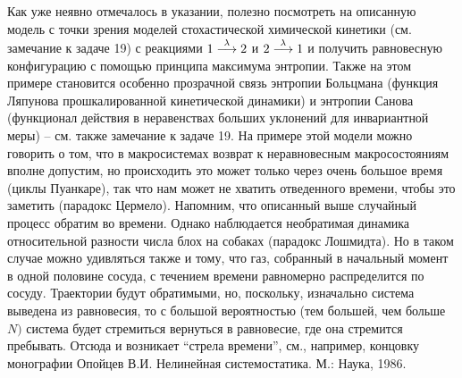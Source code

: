 \begin{remark}
 Как уже неявно отмечалось в указании, полезно посмотреть 
на описанную модель с точки зрения моделей стохастической химической 
кинетики (см. замечание к задаче 19) с реакциями $1\buildrel \lambda \over 
\longrightarrow 2$ и $2\buildrel \lambda \over \longrightarrow 1$ и получить 
равновесную конфигурацию с помощью принципа максимума энтропии. Также на 
этом примере становится особенно прозрачной связь энтропии  Больцмана (функция Ляпунова прошкалированной кинетической динамики) и энтропии Санова (функционал действия в неравенствах больших уклонений для инвариантной меры) -- см. также 
замечание к задаче 19. На примере этой модели можно говорить о том, что в 
макросистемах возврат к неравновесным макросостояниям вполне допустим, но 
происходить это может только через очень большое время (циклы Пуанкаре), так что нам может 
не хватить отведенного времени, чтобы это заметить (парадокс Цермело). Напомним, что 
описанный выше случайный процесс обратим во времени. Однако наблюдается 
необратимая динамика относительной разности числа блох на собаках (парадокс Лошмидта). Но в 
таком случае можно удивляться также и тому, что газ, собранный в начальный 
момент в одной половине сосуда, с течением времени равномерно распределится 
по сосуду. Траектории будут обратимыми, но, поскольку, изначально система 
выведена из равновесия, то с большой вероятностью (тем большей, чем больше 
$N)$ система будет стремиться вернуться в равновесие, где она стремится 
пребывать. Отсюда и возникает ``стрела времени'', см., например, концовку 
монографии Опойцев В.И. Нелинейная системостатика. М.: Наука, 1986.
\end{remark}

